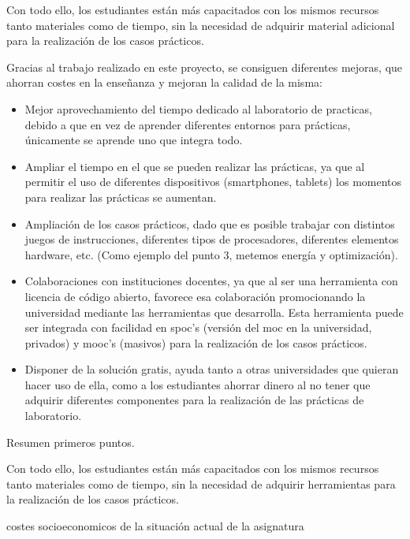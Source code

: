 Con todo ello, los estudiantes están más capacitados con los mismos recursos tanto materiales como de tiempo, sin la necesidad de adquirir material adicional para la realización de los casos prácticos.


\iffalse
Gracias al trabajo realizado en este proyecto, se consiguen diferentes mejoras, que ahorran costes en la enseñanza y mejoran la calidad de la misma:

\begin{itemize}
\item Mejor aprovechamiento del tiempo dedicado al laboratorio de practicas, debido a que en vez de aprender diferentes entornos para prácticas, únicamente se aprende uno que integra todo.

\item Ampliar el tiempo en el que se pueden realizar las prácticas, ya que al permitir el uso de diferentes dispositivos (smartphones, tablets) los momentos para realizar las prácticas se aumentan.

\item Ampliación de los casos prácticos, dado que es posible trabajar con distintos juegos de instrucciones, diferentes tipos de procesadores, diferentes elementos \gls{hardware}, etc. (Como ejemplo del punto 3, metemos energía y optimización).

\item Colaboraciones con instituciones docentes, ya que al ser una herramienta con licencia de código abierto, favorece esa colaboración promocionando la universidad mediante las herramientas que desarrolla.
Esta herramienta puede ser integrada con facilidad en spoc's (versión del moc en la universidad, privados) y mooc's (masivos) para la realización de los casos prácticos.

\item Disponer de la solución gratis, ayuda tanto a otras universidades que quieran hacer uso de ella, como a los estudiantes ahorrar dinero al no tener que adquirir diferentes componentes para la realización de las prácticas de laboratorio.

\end{itemize}

Resumen primeros puntos.

Con todo ello, los estudiantes están más capacitados con los mismos recursos tanto materiales como de tiempo, sin la necesidad de adquirir herramientas para la realización de los casos prácticos.

costes socioeconomicos de la situación actual de la asignatura

